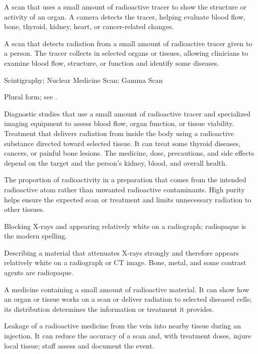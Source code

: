  A scan that uses a small amount of radioactive tracer to show the structure or activity of an organ. A camera detects the tracer, helping evaluate blood flow, bone, thyroid, kidney, heart, or cancer-related changes.

 A scan that detects radiation from a small amount of radioactive tracer given to a person. The tracer collects in selected organs or tissues, allowing clinicians to examine blood flow, structure, or function and identify some diseases.

\synonyms
Scintigraphy; Nuclear Medicine Scan; Gamma Scan

 Plural form; see .

 Diagnostic studies that use a small amount of radioactive tracer and specialized imaging equipment to assess blood flow, organ function, or tissue viability.
 Treatment that delivers radiation from inside the body using a radioactive substance directed toward selected tissue. It can treat some thyroid diseases, cancers, or painful bone lesions. The medicine, dose, precautions, and side effects depend on the target and the person’s kidney, blood, and overall health.

 The proportion of radioactivity in a preparation that comes from the intended radioactive atom rather than unwanted radioactive contaminants. High purity helps ensure the expected scan or treatment and limits unnecessary radiation to other tissues.

 Blocking X-rays and appearing relatively white on a radiograph; radiopaque is the modern spelling.

 Describing a material that attenuates X-rays strongly and therefore appears relatively
white on a radiograph or CT image. Bone, metal, and some contrast agents are radiopaque.

 A medicine containing a small amount of radioactive material. It can show how an organ or tissue works on a scan or deliver radiation to selected diseased cells; its distribution determines the information or treatment it provides.

 Leakage of a radioactive medicine from the vein into nearby tissue during an injection. It can reduce the accuracy of a scan and, with treatment doses, injure local tissue; staff assess and document the event.


